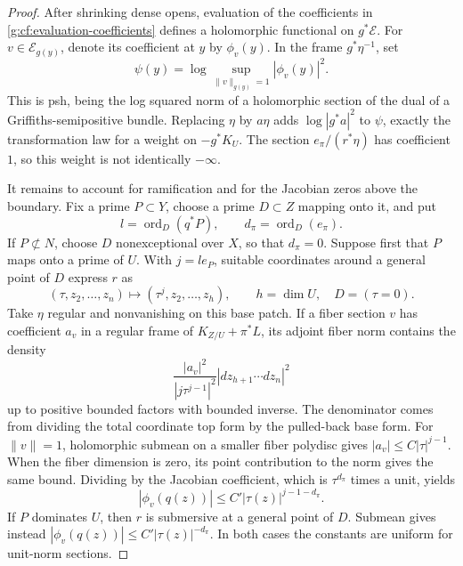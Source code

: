 \begin{proof}
After shrinking dense opens, evaluation of the coefficients in
\eqref{g:cf:evaluation-coefficients} defines a holomorphic functional
on \(g^*\mathcal E\).  For \(v\in\mathcal E_{g(y)}\), denote its
coefficient at \(y\) by \(\phi_v(y)\).  In the frame
\(g^*\eta^{-1}\), set
\begin{equation}\label{g:cf:evaluation-weight}
 \psi(y)=\log\sup_{\|v\|_{g(y)}=1}|\phi_v(y)|^2.
\end{equation}
This is psh, being the log squared norm of a holomorphic section of
the dual of a Griffiths-semipositive bundle.  Replacing \(\eta\) by
\(a\eta\) adds \(\log|g^*a|^2\) to \(\psi\), exactly the
transformation law for a weight on \(-g^*K_U\).  The section
\(e_\pi/(r^*\eta)\) has coefficient \(1\), so this weight is not
identically \(-\infty\).

It remains to account for ramification and for the Jacobian zeros
above the boundary.  Fix a prime \(P\subset Y\), choose a prime
\(D\subset Z\) mapping onto it, and put
\[
 l=\operatorname{ord}_D(q^*P),\qquad
 d_\pi=\operatorname{ord}_D(e_\pi).
\]
If \(P\not\subset N\), choose \(D\) nonexceptional over \(X\),
so that \(d_\pi=0\).  Suppose first that \(P\) maps onto a prime
of \(U\).  With \(j=le_P\), suitable coordinates around a general
point of \(D\) express \(r\) as
\[
 (\tau,z_2,\ldots,z_n)\longmapsto
 (\tau^j,z_2,\ldots,z_h),
 \qquad h=\dim U,\quad D=(\tau=0).
\]
Take \(\eta\) regular and nonvanishing on this base patch.  If a
fiber section \(v\) has coefficient \(a_v\) in a regular frame of
\(K_{Z/U}+\pi^*L\), its adjoint fiber norm contains the density
\[
 \frac{|a_v|^2}{|j\tau^{j-1}|^2}
 |dz_{h+1}\cdots dz_n|^2
\]
up to positive bounded factors with bounded inverse.  The
denominator comes from dividing the total coordinate top form by
the pulled-back base form.  For \(\|v\|=1\), holomorphic submean
on a smaller fiber polydisc gives
\( |a_v|\leq C|\tau|^{j-1}\).
When the fiber dimension is zero, its point contribution to the
norm gives the same bound.  Dividing by the Jacobian coefficient,
which is \(\tau^{d_\pi}\) times a unit, yields
\begin{equation}\label{g:cf:evaluation-boundary}
 |\phi_v(q(z))|\leq C'|\tau(z)|^{j-1-d_\pi}.
\end{equation}
If \(P\) dominates \(U\), then \(r\) is submersive at a general
point of \(D\).  Submean gives instead
\( |\phi_v(q(z))|\leq C'|\tau(z)|^{-d_\pi}\).
In both cases the constants are uniform for unit-norm sections.


\end{proof}
